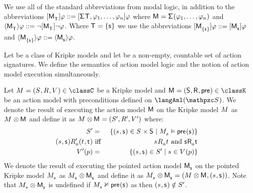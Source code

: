 We use all of the standard abbreviations from modal logic, in addition to the abbreviations 
$\actionA{\aPModel{\aStatesT}} \phi ::= \actionA{\aSignature \aStatesT, \phi_1, \dots, \phi_n} \phi$ where $\aModel = \aSignature(\phi_1, \dots, \phi_n)$ and 
$\actionE{\aPModel{\aStatesT}} \phi ::= \lnot \actionA{\aPModel{\aStatesT}} \lnot \phi$.
Where $\aStatesT = \{\aStateS\}$ we use the abbreviations 
$\actionA{\aPModel{\{\aStateS\}}} \phi ::= \actionA{\aPModel{\aStateS}} \phi$ and
$\actionE{\aPModel{\{\aStateS\}}} \phi ::= \actionE{\aPModel{\aStateS}} \phi$.

\begin{definition}\label{aml-semantics}
Let \classC{} be a class of Kripke models and let \aSignatureFamily{} be a non-empty, countable set of action signatures.
We define the semantics of action model logic and the notion of action model execution simultaneously.

Let $\kModelAndTuple \in \classC$ be a Kripke model and $\aModelAndTuple \in \classK$ be an action model with preconditions defined on $\langAml(\aSignatureFamily)$.
We denote the result of executing the action model $\aModel$ on the Kripke model $\kModel$ as $\kModel \exec \aModel$ and define it as $\kModel \exec \aModel = \kModelTupleP$ where:
\begin{eqnarray*}
    \kStatesP &=& \{(\kStateS, \aStateS) \in \kStates \times \aStates \mid \kPModel{\kStateS} \entails \aPrecondition(\aStateS)\}\\
    (\kStateS, \aStateS) \kAccessibilityPA (\kStateT, \aStateT) &\text{ iff }& \kStateS \kAccessibilityA \kStateT \text{ and } \aStateS \aAccessibilityA \aStateT\\
    \kValuationP(\atomP) &=& \{(\kStateS, \aStateS) \in \kStatesP \mid \kStateS \in \kValuation(\atomP)\}
\end{eqnarray*}
We denote the result of executing the pointed action model $\aPModel{\aStateS}$ on the pointed Kripke model $\kPModel{\kStateS}$ as $\kPModel{\kStateS} \exec \aPModel{\aStateS}$ and define it as $\kPModel{\kStateS} \exec \aPModel{\aStateS} = (\kModel \exec \aModel, (\kStateS, \aStateS))$. Note that $\kPModel{\kStateS} \exec \aPModel{\aStateS}$ is undefined if $\kPModel{\kStateS} \nentails \aPrecondition(\aStateS)$ as then $(\kStateS, \aStateS) \notin \kStatesP$.


\end{definition}
